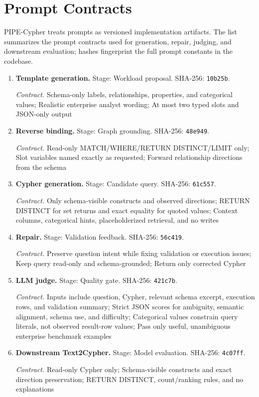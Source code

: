 \section{Prompt Contracts}
\label{sec:prompt_contracts}
\label{tab:prompt_contracts}
PIPE-Cypher treats prompts as versioned implementation artifacts. The list summarizes the prompt contracts used for generation, repair, judging, and downstream evaluation; hashes fingerprint the full prompt constants in the codebase.
\begin{enumerate}
\item \textbf{Template generation.} Stage: Workload proposal. SHA-256: \texttt{10b25b}.\par
\textit{Contract.} Schema-only labels, relationships, properties, and categorical values; Realistic enterprise analyst wording; At most two typed slots and JSON-only output
\item \textbf{Reverse binding.} Stage: Graph grounding. SHA-256: \texttt{48e949}.\par
\textit{Contract.} Read-only MATCH/WHERE/RETURN DISTINCT/LIMIT only; Slot variables named exactly as requested; Forward relationship directions from the schema
\item \textbf{Cypher generation.} Stage: Candidate query. SHA-256: \texttt{61c557}.\par
\textit{Contract.} Only schema-visible constructs and observed directions; RETURN DISTINCT for set returns and exact equality for quoted values; Context columns, categorical hints, placeholderized retrieval, and no writes
\item \textbf{Repair.} Stage: Validation feedback. SHA-256: \texttt{56c419}.\par
\textit{Contract.} Preserve question intent while fixing validation or execution issues; Keep query read-only and schema-grounded; Return only corrected Cypher
\item \textbf{LLM judge.} Stage: Quality gate. SHA-256: \texttt{421c7b}.\par
\textit{Contract.} Inputs include question, Cypher, relevant schema excerpt, execution rows, and validation summary; Strict JSON scores for ambiguity, semantic alignment, schema use, and difficulty; Categorical values constrain query literals, not observed result-row values; Pass only useful, unambiguous enterprise benchmark examples
\item \textbf{Downstream Text2Cypher.} Stage: Model evaluation. SHA-256: \texttt{4c07ff}.\par
\textit{Contract.} Read-only Cypher only; Schema-visible constructs and exact direction preservation; RETURN DISTINCT, count/ranking rules, and no explanations
\end{enumerate}
